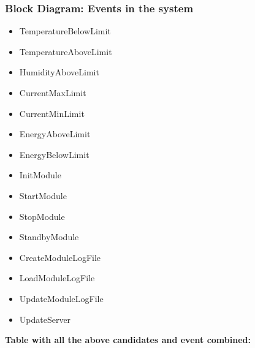 			\subsubsection{Block Diagram: Events in the system}
				\begin{itemize}
					\item TemperatureBelowLimit
					\item TemperatureAboveLimit
					\item HumidityAboveLimit
					\item CurrentMaxLimit
					\item CurrentMinLimit
					\item EnergyAboveLimit
					\item EnergyBelowLimit
					\item InitModule
					\item StartModule
					\item StopModule
					\item StandbyModule
					\item CreateModuleLogFile
					\item LoadModuleLogFile
					\item UpdateModuleLogFile
					\item UpdateServer
				\end{itemize}
				\textbf{Table with all the above candidates and event combined:}

